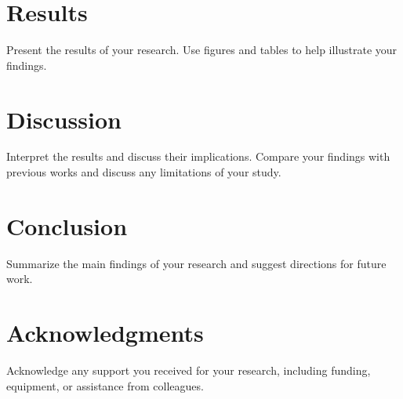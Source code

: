 \documentclass[conference]{IEEEtran}
\begin{document}
\section{Results}
Present the results of your research. Use figures and tables to help illustrate your findings.

\section{Discussion}
Interpret the results and discuss their implications. Compare your findings with previous works and discuss any limitations of your study.

\section{Conclusion}
Summarize the main findings of your research and suggest directions for future work.

\section*{Acknowledgments}
Acknowledge any support you received for your research, including funding, equipment, or assistance from colleagues.



\end{document}
